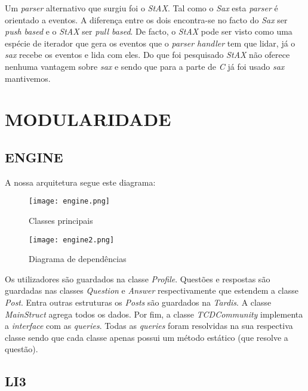 \documentclass[letterpaper, 10 pt, conference]{IEEEtran} %
\begin{document}
Um \textit{parser} alternativo que surgiu foi o \textit{StAX}.
Tal como o \textit{Sax} esta \textit{parser} é orientado a eventos. A diferença entre os dois encontra-se no facto do \textit{Sax} ser \textit{push based} e o \textit{StAX} ser \textit{pull based}. De facto, o \textit{StAX} pode ser visto como uma espécie de iterador que gera os eventos que o \textit{parser handler} tem que lidar, já o \textit{sax} recebe os eventos e lida com eles.
Do que foi pesquisado \textit{StAX} não oferece nenhuma vantagem sobre \textit{sax} e sendo que para a parte de \textit{C} já foi usado \textit{sax} mantivemos.


\section{MODULARIDADE}

\subsection{ENGINE}
A nossa arquitetura segue este diagrama:

\begin{figure}[h!]
  \centering
  \texttt{[image: engine.png]}
   \caption{Classes principais}
\end{figure}

\begin{figure}[h!]
  \centering
  \texttt{[image: engine2.png]}
   \caption{Diagrama de dependências}
\end{figure}

Os utilizadores são guardados na classe \textit{Profile}. Questões e respostas são guardadas nas classes \textit{Question} e \textit{Answer} respectivamente que estendem a classe \textit{Post}. Entra outras estruturas os \textit{Posts} são guardados na \textit{Tardis}.
A classe \textit{MainStruct} agrega todos os dados. Por fim, a classe \textit{TCDCommunity} implementa a \textit{interface} com as \textit{queries}.
Todas as \textit{queries} foram resolvidas na sua respectiva classe sendo que cada classe apenas possui um método estático (que resolve a questão).

\subsection{LI3}
\end{document}
